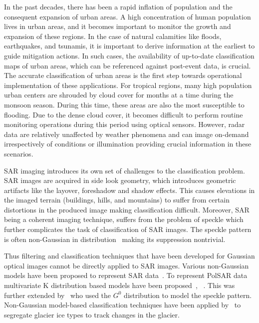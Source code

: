 In the past decades, there has been a rapid inflation of population and the consequent expansion of urban areas. A high concentration of human population lives in urban areas, and it becomes important to monitor the growth and expansion of these regions. In the case of natural calamities like floods, earthquakes, and tsunamis, it is important to derive information at the earliest to guide mitigation actions. In such cases, the availability of up-to-date  classification maps of urban areas, which can be referenced against post-event data, is crucial. The accurate classification of urban areas is the first step towards operational implementation of these applications.
For tropical regions, many high population urban centers are shrouded by cloud cover for months at a time during the monsoon season. During this time, these areas are also the most susceptible to flooding.  Due to the dense cloud cover, it becomes difficult to perform routine monitoring operations during this period using optical sensors. However, radar data are relatively unaffected by weather phenomena and can image on-demand irrespectively of conditions or illumination providing crucial information in these scenarios. 



SAR imaging introduces its own set of challenges to the classification problem. SAR images are acquired in side look geometry, which introduces geometric artifacts like the layover, foreshadow and shadow effects. This causes elevations in the imaged terrain (buildings, hills, and mountains) to suffer from certain distortions in the produced image making classification difficult. Moreover, SAR being a coherent imaging technique, suffers from the problem of speckle which further complicates the task of classification of SAR images. The speckle pattern is often non-Gaussian in distribution~\cite{jakeman1976model} making its suppression nontrivial. 

Thus filtering and classification techniques that have been developed for Gaussian optical images cannot be directly applied to SAR images. Various non-Gaussian models have been proposed to represent SAR data~\cite{jakeman1976model}. To represent PolSAR data multivariate K distribution based models have been proposed~\cite{lee1994k}, ~\cite{doulgeris2010scale}. This was further extended by~\cite{freitas2005polarimetric} who used the $G^0$ distribution to model the speckle pattern. Non-Gaussian model-based classification techniques have been applied by~\cite{akbari2010non} to segregate glacier ice types to track changes in the glacier.  


